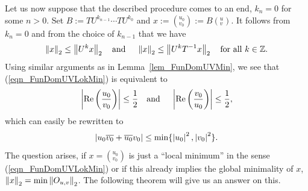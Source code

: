 Let us now suppose that the described procedure comes to an end, \ie $k_n = 0$ for some $n > 0$. Set $B  := TU^{k_{n-1}} \cdots TU^{k_0}$ and $x := ({}^{u_0}_{v_0}) := B ({}^u_v)$. It follows from $k_n = 0$ and from the choice of $k_{n-1}$ that we have 
\begin{equation}
\label{eqn_FunDomUVLokMin}
\left\| x \right\|_2 \le \left\| U^k x \right\|_2 \text{\quad and \quad} \left\| x \right\|_2 \le \left\| U^k {T}^{-1} x \right\|_2 \text{\quad for all } k \in \mathbb{Z}.
\end{equation}
Using similar arguments as in Lemma~\ref{lem_FunDomUVMin}, we see that (\ref{eqn_FunDomUVLokMin}) is equivalent to
\begin{equation*}
\left|\operatorname{Re}\left(\frac{u_0}{v_0}\right)\right| \le \frac{1}{2} \text{\quad and \quad} \left|\operatorname{Re}\left(\frac{v_0}{u_0}\right)\right| \le \frac{1}{2},
\end{equation*}
which can easily be rewritten to
\begin{equation}
\label{eqn_FunDomUVMinRegion}
\left|u_0 \overline{v_0} + \overline{u_0} v_0\right| \le \min\{\left|u_0\right|^2, \left|v_0\right|^2\}.
\end{equation}
The question arises, if $x = ({}^{u_0}_{v_0})$ is just a ``local minimum'' in the sense (\ref{eqn_FunDomUVLokMin}) or if this already implies the global minimality of $x$, \ie $\left\| x \right\|_2 = \min \left\| O_{u,v} \right\|_2$. The following theorem will give us an answer on this.

